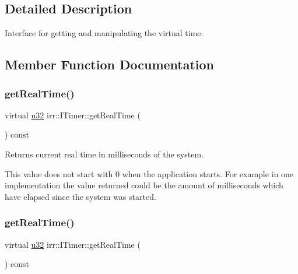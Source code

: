 \subsection{Detailed Description}
Interface for getting and manipulating the virtual time. 

\subsection{Member Function Documentation}
\mbox{\label{classirr_1_1ITimer_a67d6b3ae61c2e6aaad82c4ae15ab55f1}} 
\subsubsection{\texorpdfstring{get\+Real\+Time()}{getRealTime()}\hspace{0.1cm}{\footnotesize\ttfamily [1/2]}}
{\footnotesize\ttfamily virtual \hyperlink{namespaceirr_a0416a53257075833e7002efd0a18e804}{u32} irr\+::\+I\+Timer\+::get\+Real\+Time (\begin{DoxyParamCaption}{ }\end{DoxyParamCaption}) const\hspace{0.3cm}{\ttfamily [pure virtual]}}



Returns current real time in milliseconds of the system. 

This value does not start with 0 when the application starts. For example in one implementation the value returned could be the amount of milliseconds which have elapsed since the system was started. \mbox{\label{classirr_1_1ITimer_a67d6b3ae61c2e6aaad82c4ae15ab55f1}} 
\subsubsection{\texorpdfstring{get\+Real\+Time()}{getRealTime()}\hspace{0.1cm}{\footnotesize\ttfamily [2/2]}}
{\footnotesize\ttfamily virtual \hyperlink{namespaceirr_a0416a53257075833e7002efd0a18e804}{u32} irr\+::\+I\+Timer\+::get\+Real\+Time (\begin{DoxyParamCaption}{ }\end{DoxyParamCaption}) const\hspace{0.3cm}{\ttfamily [pure virtual]}}



